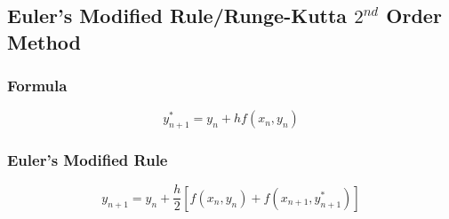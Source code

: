 \subsection{Euler's Modified Rule/Runge-Kutta $2^{nd}$ Order Method}

\subsubsection{Formula}

\[{y}^*_{n+1} = y_n + hf(x_n, y_n)\]

\subsubsection{Euler's Modified Rule}

\[{y}_{n+1} = y_n + \frac{h}{2} \left[f(x_n, y_n) + f(x_{n+1}, {y}^*_{n+1})\right]\]
